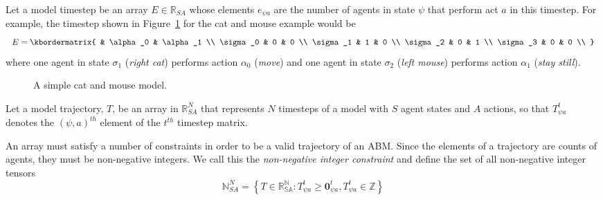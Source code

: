 \documentclass{article}
\begin{document}
Let a model timestep be an array $E \in \mathbb{R}_{SA}$ whose elements $e_{\psi a}$ are the number of agents in state $\psi$ that perform act $a$ in this timestep. For example, the timestep shown in Figure~\ref{fig:AB-MCMC-1} for the cat and mouse example would be
\[
E = \kbordermatrix{
	& \alpha_0 & \alpha_1 \\
	\sigma_0 & 0 & 0 \\
	\sigma_1 & 1 & 0 \\
	\sigma_2 & 0  & 1 \\
	\sigma_3 & 0 & 0 \\
}
\]
where one agent in state $\sigma_1$ (\textit{right cat}) performs action $\alpha_0$ (\textit{move}) and one agent in state $\sigma_2$ (\textit{left mouse}) performs action $\alpha_1$ (\textit{stay still}).

\begin{figure}[ht]
	\centering
	\caption{A simple cat and mouse model.\label{fig:AB-MCMC-1}}
\end{figure}

Let a model trajectory, $T$, be an array in $\mathbb{R}^N_{SA}$ that represents $N$ timesteps of a model with $S$ agent states and $A$ actions, so that $T^t_{\psi a}$ denotes the $(\psi, a)^{th}$ element of the $t^{th}$ timestep matrix.

An array must satisfy a number of constraints in order to be a valid trajectory of an ABM. Since the elements of a trajectory are counts of agents, they must be non-negative integers. We call this the \textit{non-negative integer constraint} and define the set of all non-negative integer tensors
\begin{equation}
\mathbb{N}^N_{SA} = \left\{ T \in \mathbb{R^N_{SA}}: T^t_{\psi a} \ge \mathbf{0}^t_{\psi a}, T^t_{\psi a} \in \mathbb{Z}\right\}
\label{nonNegativeInt}
\end{equation}
\end{document}
